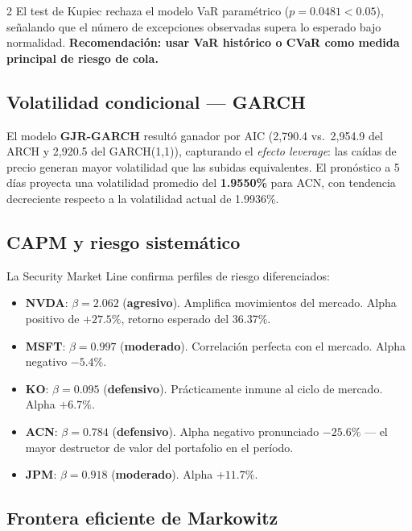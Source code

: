 \documentclass[10pt,a4paper]{article}
\newcommand{\ticker}[2]{\textcolor{#1}{\textbf{#2}}}
\begin{document}
\begin{multicols}{2}
\vspace{4pt}
El test de Kupiec rechaza el modelo VaR paramétrico ($p=0.0481<0.05$), señalando que el número de excepciones observadas supera lo esperado bajo normalidad. \textbf{Recomendación: usar VaR histórico o CVaR como medida principal de riesgo de cola.}

\subsection{Volatilidad condicional — GARCH}

El modelo \textbf{GJR-GARCH} resultó ganador por AIC (2,790.4 vs.\ 2,954.9 del ARCH y 2,920.5 del GARCH(1,1)), capturando el \emph{efecto leverage}: las caídas de precio generan mayor volatilidad que las subidas equivalentes. El pronóstico a 5 días proyecta una volatilidad promedio del \textbf{1.9550\%} para ACN, con tendencia decreciente respecto a la volatilidad actual de 1.9936\%.

\columnbreak

\subsection{CAPM y riesgo sistemático}

La Security Market Line confirma perfiles de riesgo diferenciados:

\begin{itemize}
  \item \ticker{nvda}{NVDA}: $\beta=2.062$ (\textbf{agresivo}). Amplifica movimientos del mercado. Alpha positivo de $+27.5\%$, retorno esperado del 36.37\%.
  \item \ticker{msft}{MSFT}: $\beta=0.997$ (\textbf{moderado}). Correlación perfecta con el mercado. Alpha negativo $-5.4\%$.
  \item \ticker{ko}{KO}: $\beta=0.095$ (\textbf{defensivo}). Prácticamente inmune al ciclo de mercado. Alpha $+6.7\%$.
  \item \ticker{acn}{ACN}: $\beta=0.784$ (\textbf{defensivo}). Alpha negativo pronunciado $-25.6\%$ — el mayor destructor de valor del portafolio en el período.
  \item \ticker{jpm}{JPM}: $\beta=0.918$ (\textbf{moderado}). Alpha $+11.7\%$.
\end{itemize}

\subsection{Frontera eficiente de Markowitz}


\end{multicols}
\end{document}
